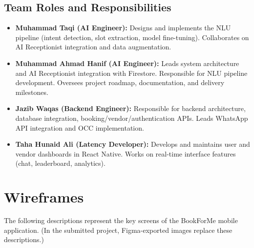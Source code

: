 \subsection{Team Roles and Responsibilities}

\begin{itemize}
  \item \textbf{Muhammad Taqi (AI Engineer):} Designs and implements the NLU pipeline
        (intent detection, slot extraction, model fine-tuning).  Collaborates on AI
        Receptionist integration and data augmentation.
  \item \textbf{Muhammad Ahmad Hanif (AI Engineer):} Leads system architecture and
        AI Receptionist integration with Firestore.  Responsible for NLU pipeline
        development.  Oversees project roadmap, documentation, and delivery milestones.
  \item \textbf{Jazib Waqas (Backend Engineer):} Responsible for backend architecture,
        database integration, booking/vendor/authentication APIs.  Leads WhatsApp API
        integration and OCC implementation.
  \item \textbf{Taha Hunaid Ali (Latency Developer):} Develops and maintains user and
        vendor dashboards in React Native.  Works on real-time interface features (chat,
        leaderboard, analytics).
\end{itemize}

\section{Wireframes}
\label{sec:srs-wireframes}

The following descriptions represent the key screens of the BookForMe mobile
application.  (In the submitted project, Figma-exported images replace these
descriptions.)

